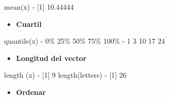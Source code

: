 \documentclass[
]{book}
\newenvironment{Shaded}{\begin{snugshade}}{\end{snugshade}}
\newcommand{\DecValTok}[1]{\textcolor[rgb]{0.00,0.00,0.81}{#1}}
\newcommand{\FloatTok}[1]{\textcolor[rgb]{0.00,0.00,0.81}{#1}}
\newcommand{\FunctionTok}[1]{\textcolor[rgb]{0.00,0.00,0.00}{#1}}
\newcommand{\NormalTok}[1]{#1}
\newcommand{\SpecialCharTok}[1]{\textcolor[rgb]{0.00,0.00,0.00}{#1}}
\providecommand{\tightlist}{%
  \setlength{\itemsep}{0pt}\setlength{\parskip}{0pt}}
\begin{document}
\begin{Shaded}
\begin{Highlighting}[]
\FunctionTok{mean}\NormalTok{(x)}
\SpecialCharTok{{-}}\NormalTok{ [}\DecValTok{1}\NormalTok{] }\FloatTok{10.44444}
\end{Highlighting}
\end{Shaded}

\begin{itemize}
\tightlist
\item
  \textbf{Cuartil}
\end{itemize}

\begin{Shaded}
\begin{Highlighting}[]
\FunctionTok{quantile}\NormalTok{(x)}
\SpecialCharTok{{-}}   \DecValTok{0}\SpecialCharTok{\%  25\%}  \DecValTok{50}\SpecialCharTok{\%  75\%} \DecValTok{100}\NormalTok{\% }
\SpecialCharTok{{-}}    \DecValTok{1}    \DecValTok{3}   \DecValTok{10}   \DecValTok{17}   \DecValTok{24}
\end{Highlighting}
\end{Shaded}

\begin{itemize}
\tightlist
\item
  \textbf{Longitud del vector}
\end{itemize}

\begin{Shaded}
\begin{Highlighting}[]
\FunctionTok{length}\NormalTok{ (x)}
\SpecialCharTok{{-}}\NormalTok{ [}\DecValTok{1}\NormalTok{] }\DecValTok{9}
\FunctionTok{length}\NormalTok{(letters)}
\SpecialCharTok{{-}}\NormalTok{ [}\DecValTok{1}\NormalTok{] }\DecValTok{26}
\end{Highlighting}
\end{Shaded}

\begin{itemize}
\tightlist
\item
  \textbf{Ordenar}
\end{itemize}
\end{document}
